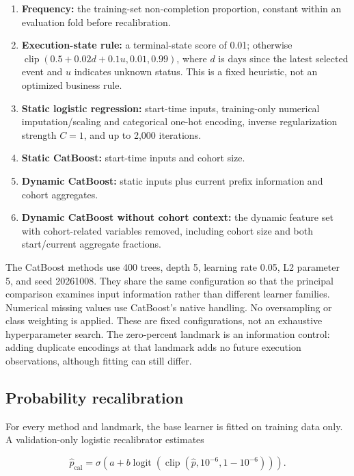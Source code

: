 \begin{enumerate}
\def\labelenumi{\arabic{enumi}.}
\tightlist
\item
  \textbf{Frequency:} the training-set non-completion proportion, constant within an evaluation fold before recalibration.
\item
  \textbf{Execution-state rule:} a terminal-state score of 0.01; otherwise \(\operatorname{clip}(0.5+0.02d+0.1u,0.01,0.99)\), where \(d\) is days since the latest selected event and \(u\) indicates unknown status. This is a fixed heuristic, not an optimized business rule.
\item
  \textbf{Static logistic regression:} start-time inputs, training-only numerical imputation/scaling and categorical one-hot encoding, inverse regularization strength \(C=1\), and up to 2,000 iterations.
\item
  \textbf{Static CatBoost:} start-time inputs and cohort size.
\item
  \textbf{Dynamic CatBoost:} static inputs plus current prefix information and cohort aggregates.
\item
  \textbf{Dynamic CatBoost without cohort context:} the dynamic feature set with cohort-related variables removed, including cohort size and both start/current aggregate fractions.
\end{enumerate}

The CatBoost methods use 400 trees, depth 5, learning rate 0.05, L2 parameter 5, and seed 20261008. They share the same configuration so that the principal comparison examines input information rather than different learner families. Numerical missing values use CatBoost's native handling. No oversampling or class weighting is applied. These are fixed configurations, not an exhaustive hyperparameter search. The zero-percent landmark is an information control: adding duplicate encodings at that landmark adds no future execution observations, although fitting can still differ.

\subsection{Probability recalibration}\label{probability-recalibration}

For every method and landmark, the base learner is fitted on training data only. A validation-only logistic recalibrator estimates

\[
\widehat p_{\mathrm{cal}}=\sigma\!\left(a+b\operatorname{logit}(\operatorname{clip}(\widehat p,10^{-6},1-10^{-6}))\right).
\]

